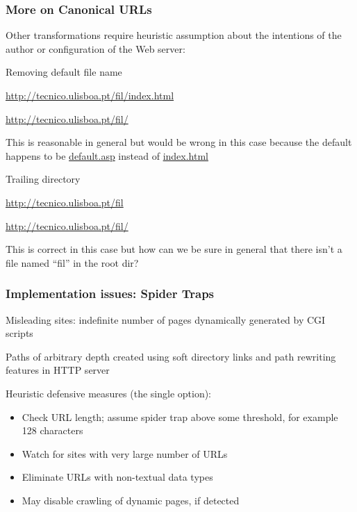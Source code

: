 \documentclass{beamer}
\begin{document}
\begin{frame} \frametitle{More on Canonical URLs}

Other transformations require heuristic assumption about the intentions of the author or configuration of the Web server:

\begin{block}{Removing default file name}

\url{http://tecnico.ulisboa.pt/fil/index.html}

\url{http://tecnico.ulisboa.pt/fil/}

This is reasonable in general but would be wrong in this case because the default happens to be \url{default.asp} instead of \url{index.html}
\end{block}

\begin{block}{Trailing directory}

\url{http://tecnico.ulisboa.pt/fil}

\url{http://tecnico.ulisboa.pt/fil/}

This is correct in this case but how can we be sure in general that there isn't a file named ``fil'' in the root dir?
\end{block}

\end{frame}



\begin{frame} \frametitle{Implementation issues: Spider Traps}

Misleading sites: indefinite number of pages dynamically generated by CGI scripts 

Paths of arbitrary depth created using soft directory links and path rewriting features in HTTP server

\begin{block}{Heuristic defensive measures (the single option):}

\begin{itemize}
\item Check URL length; assume spider trap above some threshold, for example 128 characters
\item Watch for sites with very large number of URLs
\item Eliminate URLs with non-textual data types
\item May disable crawling of dynamic pages, if detected
\end{itemize}
\end{block}

\end{frame}
\end{document}
